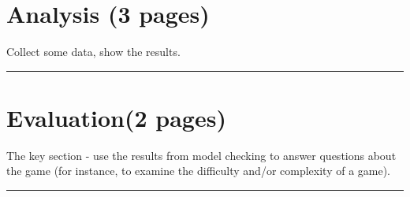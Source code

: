 \section{Analysis (3 pages)}

Collect some data, show the results.

\hrule

\Blindtext

\Blindtext

\Blindtext

\section{Evaluation(2 pages)}

The key section - use the results from model checking to answer questions about the game (for instance, to examine the difficulty and/or complexity of a game).

\hrule

\Blindtext

\Blindtext